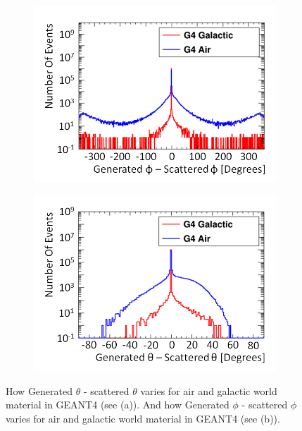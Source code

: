 \begin{figure}[!h]
\centering
\begin{subfigure}{.5\textwidth}
  \centering
  \includegraphics[width=\linewidth]{Chapter4/Figs/Raster/CryPlots/genPhi-scatPhiMedText.png}
  \captionsetup{width=.9\linewidth}
  \caption{}
  \label{subFig:genPhi-scatPhi}
\end{subfigure}%
\begin{subfigure}{.5\textwidth}
  \centering
  \includegraphics[width=\linewidth]{Chapter4/Figs/Raster/CryPlots/genTheta-scatThetaMedText.png}
  \captionsetup{width=.9\linewidth}
  \caption{}
  \label{subFig:genTheta-scatPhi}
\end{subfigure}
\caption{How Generated $\theta$ - scattered $\theta$ varies for air and galactic world material in GEANT4 (see (a)). And how Generated $\phi$ - scattered $\phi$ varies for air and galactic world material in GEANT4 (see (b)).}
\label{fig:gen-scat_PhiTheta}
\end{figure}

